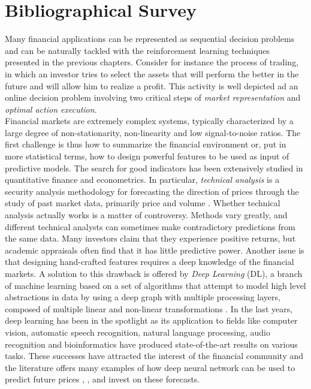 \section{Bibliographical Survey}
\label{sec:bibliographical_survey}

Many financial applications can be represented as sequential decision problems and can be naturally tackled with the reinforcement learning techniques presented in the previous chapters. Consider for instance the process of trading, in which an investor tries to select the assets that will perform the better in the future and will allow him to realize a profit. This activity is well depicted ad an online decision problem involving two critical steps of \emph{market representation} and \emph{optimal action execution}.\\
Financial markets are extremely complex systems, typically characterized by a large degree of non-stationarity, non-linearity and low signal-to-noise ratios. The first challenge is thus how to summarize the financial environment or, put in more statistical terms, how to design powerful features to be used as input of predictive models. The search for good indicators has been extensively studied in quantitative finance and econometrics. In particular, \emph{technical analysis} is a security analysis methodology for forecasting the direction of prices through the study of past market data, primarily price and volume \cite{lo2000foundations}. Whether technical analysis actually works is a matter of controversy. Methods vary greatly, and different technical analysts can sometimes make contradictory predictions from the same data. Many investors claim that they experience positive returns, but academic appraisals often find that it has little predictive power. Another issue is that designing hand-crafted features requires a deep knowledge of the financial markets. A solution to this drawback is offered by \emph{Deep Learning} (DL), a branch of machine learning based on a set of algorithms that attempt to model high level abstractions in data by using a deep graph with multiple processing layers, composed of multiple linear and non-linear transformations \cite{Goodfellow-et-al-2016-Book}. In the last years, deep learning has been in the spotlight as its application to fields like computer vision, automatic speech recognition, natural language processing, audio recognition and bioinformatics have produced state-of-the-art results on various tasks. These successes have attracted the interest of the financial community and the literature offers many examples of how deep neural network can be used to predict future prices \cite{kamijo1990stock}, \cite{saad1998comparative}, \cite{liang2011stock} and invest on these forecasts.\\ 
